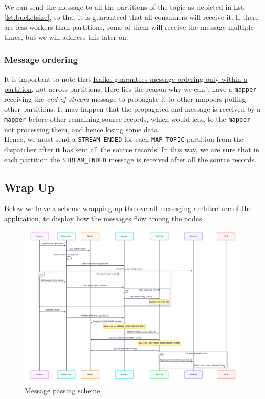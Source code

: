We can send the message to all the partitions of the topic as depicted in Lst. \ref{lst:bucketsize}, so that it is guaranteed that all consumers will receive it. If there are less workers than partitions, some of them will receive the message multiple times, but we will address this later on.


\subsubsection{Message ordering}
It is important to note that \ul{Kafka guarantees message ordering only within a partition}, not across partitions.
Here lies the reason why we can't have a \texttt{mapper} receiving the \textit{end of stream} message to propagate it to other mappers polling other partitions. It may happen that the propagated end message is received by a \texttt{mapper} before other remaining source records, which would lead to the \texttt{mapper} not processing them, and hence losing some data.\\
Hence, we must send a \verb|STREAM_ENDED| for each \verb|MAP_TOPIC| partition from the dispatcher after it has sent all the source records.
In this way, we are sure that in each partition the \verb|STREAM_ENDED| message is received after all the source records.

\newpage
\subsection{Wrap Up}
Below we have a scheme wrapping up the overall messaging architecture of the application, to display how the messages flow among the nodes.

\begin{figure}[htbp]
   \centering
   \includegraphics[width=\columnwidth]{images/messagePassing.png}
   \caption{Message passing scheme}
   \label{fig:messagePassing}
\end{figure}

